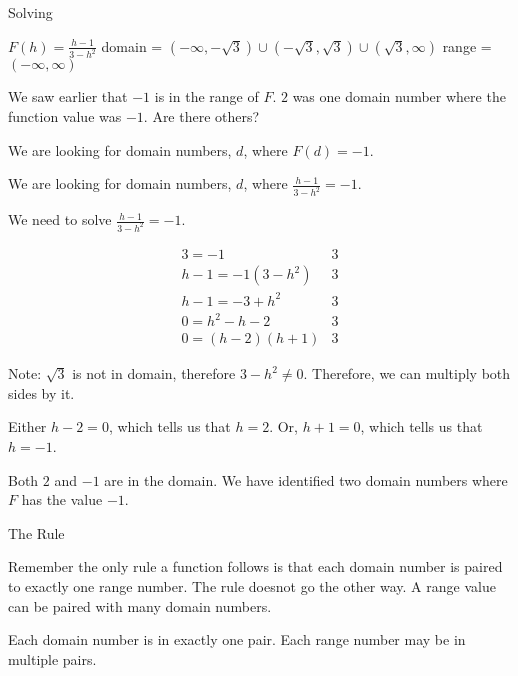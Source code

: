 \documentclass{ximera}
\begin{document}
\begin{example}   Solving

$F(h) = \frac{h-1}{3-h^2}$
domain = $(-\infty, -\sqrt{3}) \cup (-\sqrt{3}, \sqrt{3}) \cup (\sqrt{3}, \infty)$
range = $(-\infty, \infty)$


We saw earlier that $-1$ is in the range of $F$. $2$ was one domain number where the function value was $-1$. Are there others?


We are looking for domain numbers, $d$, where $F(d) = -1$.  

We are looking for domain numbers, $d$, where $\frac{h-1}{3-h^2} = -1$.  

We need to solve $\frac{h-1}{3-h^2} = -1$.



\[
\begin{array}{ll}
3 = -1 &  3\\
h - 1 = -1 (3 - h^2)    &  3 \\
h - 1 = -3 + h^2    &      3\\
0 = h^2 - h - 2    &      3\\
0 =(h-2)(h+1)    &   3   
\end{array}
\]


Note:  $\sqrt{3}$ is not in domain, therefore $3 - h^2 \ne 0$. Therefore, we can multiply both sides by it.  

Either $h-2 = 0$, which tells us that $h = 2$. Or, $h+1 = 0$, which tells us that $h = -1$.

Both $2$ and $-1$ are in the domain.  We have identified two domain numbers where $F$ has the value $-1$.



\end{example}



\begin{remark}  The Rule

Remember the only rule a function follows is that each domain number is paired to exactly one range number.  The rule doesnot go the other way.  A range value can be paired with many domain numbers.

Each domain number is in exactly one pair.
Each range number may be in multiple pairs.


\end{remark}
\end{document}
